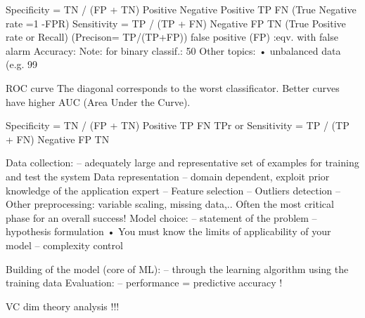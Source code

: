 \begin{description}
Specificity = TN / (FP + TN)
Positive
 Negative
Positive
 TP
 FN
 (True Negative rate =1 -FPR)
Sensitivity = TP / (TP + FN)
Negative
 FP
 TN
(True Positive rate or Recall)
(Precison= TP/(TP+FP))
false positive (FP) :eqv. with
false alarm
Accuracy: %
Note: for binary classif.: 50%
Other topics:
• unbalanced data (e.g. 99%

ROC curve
The diagonal corresponds
to the worst classificator.
Better curves have higher
AUC (Area Under the
Curve).

Specificity = TN / (FP + TN)
Positive
 TP
 FN
 TPr or Sensitivity = TP / (TP + FN)
Negative
 FP
 TN

 Data collection:
–
 adequately large and representative set of examples
for training and test the system
Data representation
– domain dependent, exploit prior knowledge of the
application expert
– Feature selection
– Outliers detection
– Other preprocessing: variable scaling, missing data,..
Often the most critical phase for an overall success!
Model choice:
– statement of the problem
– hypothesis formulation
• You must know the limits of applicability of your model
– complexity control

Building of the model (core of ML):
– through the learning algorithm using the
training data
Evaluation:
– performance = predictive accuracy !
\end{description}
VC dim theory analysis !!!

